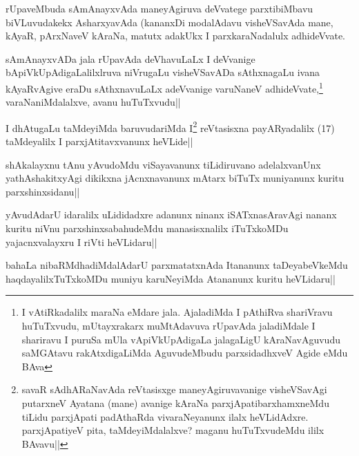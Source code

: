 
\begin{artha}
rUpaveMbuda sAmAnayxvAda maneyAgiruva deVvatege parxtibiMbavu biVLuvudakekx AsharxyavAda (kananxDi modalAdavu visheVSavAda mane, kAyaR, pArxNaveV kAraNa, matutx adakUkx I parxkaraNadalulx adhideVvate.
\end{artha}


\begin{artha}
sAmAnayxvADa jala rUpavAda deVhavuLaLx I deVvanige bApiVkUpAdigaLalilxlruva  niVrugaLu visheVSavADa sAthxnagaLu ivana kAyaRvAgive eraDu sAthxnavuLaLx adeVvanige varuNaneV adhideVvate,\footnote[2]{I vAtiRkadalilx maraNa eMdare jala. AjaladiMda I pAthiRva shariVravu huTuTxvudu, mUtayxrakarx muMtAdavuva rUpavAda jaladiMdale I shariravu I puruSa mUla vApiVkUpAdigaLa jalagaLigU kAraNavAguvudu saMGAtavu rakAtxdigaLiMda AguvudeMbudu parxsidadhxveV Agide eMdu BAva} varaNaniMdalalxve, avanu huTuTxvudu||
\end{artha}

\begin{artha}%
\stext I dhAtugaLu taMdeyiMda baruvudariMda I\footnote[1]{savaR sAdhARaNavAda reVtasisxge maneyAgiruvavanige visheVSavAgi putarxneV Ayatana (mane) avanige kAraNa parxjApatibarxhamxneMdu tiLidu parxjApati padAthaRda vivaraNeyanunx ilalx heVLidAdxre. parxjApatiyeV pita, taMdeyiMdalalxve? maganu huTuTxvudeMdu ililx BAvavu||} reVtasisxna payARyadalilx (17) taMdeyalilx I parxjAtitavxvanunx heVLide||
\end{artha}

\begin{artha}
shAkalayxnu tAnu yAvudoMdu viSayavanunx tiLidiruvano adelalxvanUnx yathAshakitxyAgi dikikxna jAcnxnavanunx mAtarx biTuTx muniyanunx kuritu parxshinxsidanu||
\end{artha}

\begin{artha}
yAvudAdarU idaralilx uLididadxre adanunx ninanx iSATxnasAravAgi nananx kuritu niVnu parxshinxsabahudeMdu manasisxnalilx iTuTxkoMDu yajacnxvalayxru I riVti heVLidaru||
\end{artha}

\begin{artha}
bahaLa nibaRMdhadiMdalAdarU parxmatatxnAda Itananunx taDeyabeVkeMdu haqdayalilxTuTxkoMDu muniyu karuNeyiMda Atananunx kuritu heVLidaru||
\end{artha}%

